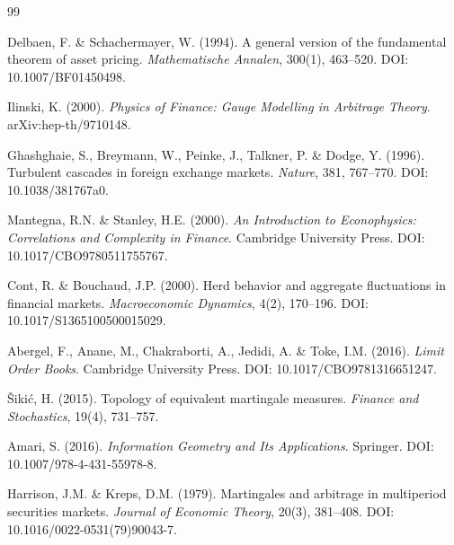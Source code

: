 \begin{thebibliography}{99}

Delbaen, F. \& Schachermayer, W. (1994). A general version of the fundamental theorem of asset pricing. \textit{Mathematische Annalen}, 300(1), 463--520. DOI: 10.1007/BF01450498.

Ilinski, K. (2000). \textit{Physics of Finance: Gauge Modelling in Arbitrage Theory}. arXiv:hep-th/9710148.

Ghashghaie, S., Breymann, W., Peinke, J., Talkner, P. \& Dodge, Y. (1996). Turbulent cascades in foreign exchange markets. \textit{Nature}, 381, 767--770. DOI: 10.1038/381767a0.

Mantegna, R.N. \& Stanley, H.E. (2000). \textit{An Introduction to Econophysics: Correlations and Complexity in Finance}. Cambridge University Press. DOI: 10.1017/CBO9780511755767.

Cont, R. \& Bouchaud, J.P. (2000). Herd behavior and aggregate fluctuations in financial markets. \textit{Macroeconomic Dynamics}, 4(2), 170--196. DOI: 10.1017/S1365100500015029.

Abergel, F., Anane, M., Chakraborti, A., Jedidi, A. \& Toke, I.M. (2016). \textit{Limit Order Books}. Cambridge University Press. DOI: 10.1017/CBO9781316651247.

\v{S}iki\'c, H. (2015). Topology of equivalent martingale measures. \textit{Finance and Stochastics}, 19(4), 731--757.

Amari, S. (2016). \textit{Information Geometry and Its Applications}. Springer. DOI: 10.1007/978-4-431-55978-8.

Harrison, J.M. \& Kreps, D.M. (1979). Martingales and arbitrage in multiperiod securities markets. \textit{Journal of Economic Theory}, 20(3), 381--408. DOI: 10.1016/0022-0531(79)90043-7.

\end{thebibliography}


